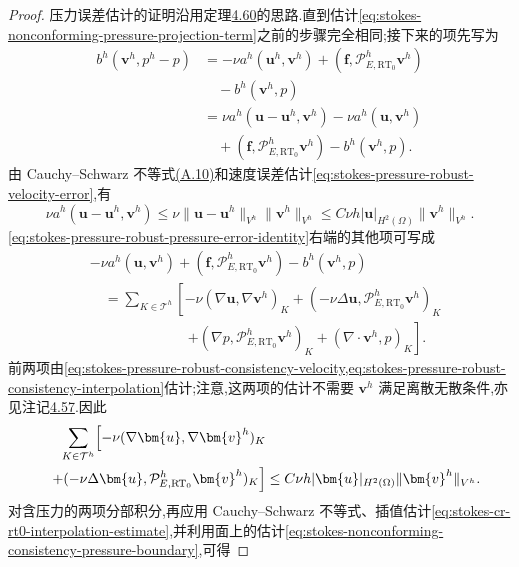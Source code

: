 \begin{proof}
压力误差估计的证明沿用定理\hyperref[thm:stokes-nonconforming-pressure-error]{4.60}的思路.直到估计\cref{eq:stokes-nonconforming-pressure-projection-term}之前的步骤完全相同;接下来的项先写为
\begin{equation}\label{eq:stokes-pressure-robust-pressure-error-identity}
\begin{aligned}
  b^h(\bm{v}^h,p^h-p)
  &=-\nu a^h(\bm{u}^h,\bm{v}^h)
       +(\bm{f},\mathcal{P}_{E,\mathrm{RT}_0}^h\bm{v}^h)\\
  &\quad-b^h(\bm{v}^h,p)\\
  &=\nu a^h(\bm{u}-\bm{u}^h,\bm{v}^h)
       -\nu a^h(\bm{u},\bm{v}^h)\\
  &\quad+(\bm{f},\mathcal{P}_{E,\mathrm{RT}_0}^h\bm{v}^h)
       -b^h(\bm{v}^h,p).
\end{aligned}
\end{equation}
由 Cauchy--Schwarz 不等式\hyperref[eq:appendix-a-10]{(A.10)}和速度误差估计\cref{eq:stokes-pressure-robust-velocity-error},有
\[
  \nu a^h(\bm{u}-\bm{u}^h,\bm{v}^h)
  \leq \nu\|\bm{u}-\bm{u}^h\|_{V^h}
           \|\bm{v}^h\|_{V^h}
  \leq C\nu h|\bm{u}|_{H^2(\Omega)}
           \|\bm{v}^h\|_{V^h}.
\]
\cref{eq:stokes-pressure-robust-pressure-error-identity}右端的其他项可写成
\begin{align*}
  &-\nu a^h(\bm{u},\bm{v}^h)
       +(\bm{f},\mathcal{P}_{E,\mathrm{RT}_0}^h\bm{v}^h)
       -b^h(\bm{v}^h,p)\\
  &\quad=\sum_{K\in\mathcal{T}^h}\left[
       -\nu(\nabla\bm{u},\nabla\bm{v}^h)_K
       +(-\nu\Delta\bm{u},
          \mathcal{P}_{E,\mathrm{RT}_0}^h\bm{v}^h)_K\right.\\
  &\hspace{7em}\left.
       +(\nabla p,\mathcal{P}_{E,\mathrm{RT}_0}^h\bm{v}^h)_K
       +(\nabla\cdot\bm{v}^h,p)_K\right].
\end{align*}
前两项由\cref{eq:stokes-pressure-robust-consistency-velocity,eq:stokes-pressure-robust-consistency-interpolation}估计;注意,这两项的估计不需要 $\bm{v}^h$ 满足离散无散条件,亦见注记\hyperref[note:stokes-nonconforming-consistency-test-functions]{4.57}.因此
\[
\begin{aligned}
  \sum_{K\in\mathcal{T}^h}\Bigl[
       -\nu(\nabla\bm{u},\nabla\bm{v}^h)_K\\
       \qquad+(-\nu\Delta\bm{u},
          \mathcal{P}_{E,\mathrm{RT}_0}^h\bm{v}^h)_K
  \Bigr]
  &\leq C\nu h|\bm{u}|_{H^2(\Omega)}
       \|\bm{v}^h\|_{V^h}.
\end{aligned}
\]
对含压力的两项分部积分,再应用 Cauchy--Schwarz 不等式、插值估计\cref{eq:stokes-cr-rt0-interpolation-estimate},并利用面上的估计\cref{eq:stokes-nonconforming-consistency-pressure-boundary},可得

\end{proof}
